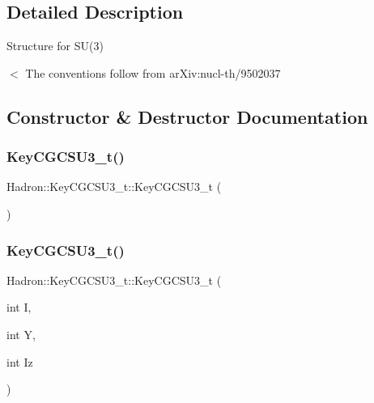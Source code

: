 \subsection{Detailed Description}
Structure for S\+U(3) 

$<$ The conventions follow from ar\+Xiv\+:nucl-\/th/9502037 

\subsection{Constructor \& Destructor Documentation}
\mbox{\label{structHadron_1_1KeyCGCSU3__t_a54336691c05ca5cdc4d34e5bf63a9ad3}} 
\subsubsection{\texorpdfstring{KeyCGCSU3\_t()}{KeyCGCSU3\_t()}\hspace{0.1cm}{\footnotesize\ttfamily [1/6]}}
{\footnotesize\ttfamily Hadron\+::\+Key\+C\+G\+C\+S\+U3\+\_\+t\+::\+Key\+C\+G\+C\+S\+U3\+\_\+t (\begin{DoxyParamCaption}{ }\end{DoxyParamCaption})\hspace{0.3cm}{\ttfamily [inline]}}

\mbox{\label{structHadron_1_1KeyCGCSU3__t_a1b0584c75fa2b450db1e3ad40d7422a2}} 
\subsubsection{\texorpdfstring{KeyCGCSU3\_t()}{KeyCGCSU3\_t()}\hspace{0.1cm}{\footnotesize\ttfamily [2/6]}}
{\footnotesize\ttfamily Hadron\+::\+Key\+C\+G\+C\+S\+U3\+\_\+t\+::\+Key\+C\+G\+C\+S\+U3\+\_\+t (\begin{DoxyParamCaption}\item[{int}]{I,  }\item[{int}]{Y,  }\item[{int}]{Iz }\end{DoxyParamCaption})\hspace{0.3cm}{\ttfamily [inline]}}

